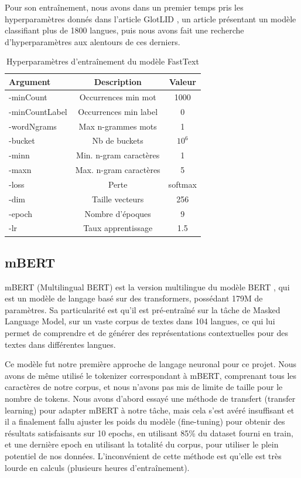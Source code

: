 Pour son entraînement, nous avons dans un premier temps pris les hyperparamètres donnés dans l'article GlotLID \cite{Kargaran_2023}, un article présentant un modèle classifiant plus de 1800 langues, puis nous avons fait une recherche d'hyperparamètres aux alentours de ces derniers. 

\begin{table}[h]
    \centering
    \small
    \begin{tabular}{lcc}
        \hline
        \textbf{Argument} & \textbf{Description} & \textbf{Valeur} \\
        \hline
        -minCount & Occurrences min mot & 1000 \\
        -minCountLabel & Occurrences min label & 0 \\
        -wordNgrams & Max n-grammes mots & 1 \\
        -bucket & Nb de buckets & $10^6$ \\
        -minn & Min. n-gram caractères & 1 \\
        -maxn & Max. n-gram caractères & 5 \\
        -loss & Perte & softmax \\
        -dim & Taille vecteurs & 256 \\
        -epoch & Nombre d'époques & 9 \\
        -lr & Taux apprentissage & 1.5 \\
        \hline
    \end{tabular}
    \caption{Hyperparamètres d'entraînement du modèle FastText}
    \label{tab:glotlid-m-hyperparams}
\end{table}

\subsection{mBERT}

mBERT (Multilingual BERT) est la version multilingue du modèle BERT \cite{devlin2019bert}, qui est un modèle de langage basé sur des transformers, possédant 179M de paramètres. Sa particularité est qu'il est pré-entraîné sur la tâche de Masked Language Model, sur un vaste corpus de textes dans 104 langues, ce qui lui permet de comprendre et de générer des représentations contextuelles pour des textes dans différentes langues.

Ce modèle fut notre première approche de langage neuronal pour ce projet.  Nous avons de même utilisé le tokenizer correspondant à mBERT, comprenant tous les caractères de notre corpus, et nous n'avons pas mis de limite de taille pour le nombre de tokens. Nous avons d'abord essayé une méthode de transfert (transfer learning) pour adapter mBERT à notre tâche, mais cela s'est avéré insuffisant et il a finalement fallu ajuster les poids du modèle (fine-tuning) pour obtenir des résultats satisfaisants sur 10 epochs, en utilisant 85\% du dataset fourni en train, et une dernière epoch en utilisant la totalité du corpus, pour utiliser le plein potentiel de nos données. L'inconvénient de cette méthode est qu'elle est très lourde en calculs (plusieurs heures d'entraînement).

